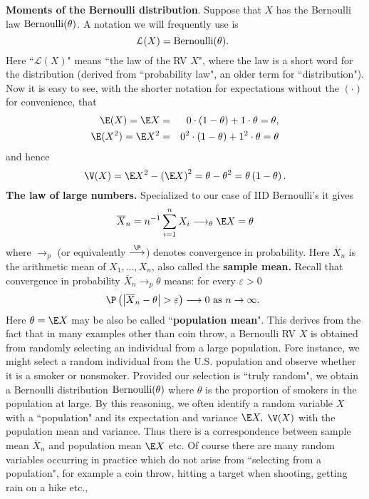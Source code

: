 \textbf{Moments of the Bernoulli distribution}. Suppose that $X$ has the
Bernoulli law $\mbox{{\rm Bernoulli}}(\theta)$. A notation we will frequently use is 
\begin{equation*}
\mathcal{L}(X)=\mbox{{\rm Bernoulli}}(\theta)\text{. }
\end{equation*}%
Here ``$\mathcal{L}(X)$" means ``the law of the RV $X$", where the law is
a short word for the distribution (derived from ``probability law", an older
term for ``distribution"). Now it is easy to see, with the shorter notation for expectations without the $(\cdot)$ for convenience, that 
\begin{eqnarray*}
\E (X) = \E X &=&0\cdot \left( 1-\theta\right) +1\cdot \theta=\theta, \\
\E (X^2) = \E X^{2} &=&0^{2}\cdot \left( 1-\theta\right) +1^{2}\cdot \theta=\theta
\end{eqnarray*}%
and hence 
\begin{equation*}
\V(X)=\E X^{2}-\left( \E X\right) ^{2}=\theta-\theta^{2}=\theta\left( 1-\theta\right) .
\end{equation*}%
\textbf{The law of large numbers. }Specialized to our case of IID
Bernoulli's it gives 
\begin{equation*}
\overline{X}_{n}=n^{-1}\sum_{i=1}^{n}X_{i}\longrightarrow _{\theta}\E X=\theta
\end{equation*}%
where $\longrightarrow_{p}$ (or equivalently $\overset{\P}{\longrightarrow}$) denotes convergence in probability. Here $\overline{X%
}_{n}$ is the arithmetic mean of $X_{1},\ldots ,X_{n}$, also called the 
\textbf{sample mean.} Recall that convergence in probability $\overline{X}%
_{n}\longrightarrow_{p} \theta$ means: for every $\varepsilon >0$ 
\begin{equation*}
\P \left( \left\vert \overline{X}_{n}-\theta\right\vert >\varepsilon \right)
\longrightarrow 0\text{ as }n\rightarrow \infty \text{. }
\end{equation*}%
Here $\theta=\E X$ may be also be called ``\textbf{population mean}". This derives
from the fact that in many examples other than coin throw, a Bernoulli RV $X$ 
is obtained from randomly selecting an individual from a large
population. Fore instance, we might select a random individual from the U.S.
population and observe whether it is a smoker or nonsmoker. Provided our
selection is ``truly random", we obtain a Bernoulli distribution $\mbox{{\rm Bernoulli}}(\theta)$ 
where $\theta$ is the proportion of smokers in the population at large. By
this reasoning, we often identify a random variable $X$ with a ``population"
and its expectation and variance $\E X,$ $\V(X)$ with the population
mean and variance. Thus there is a correspondence between sample mean $\overline{X%
}_{n}$ and population mean $\E X$ etc. Of course there are many random
variables occurring in practice which do not arise from ``selecting from a
population", for example a coin throw, hitting a target when shooting,
getting rain on a hike etc., \bigskip \bigskip

